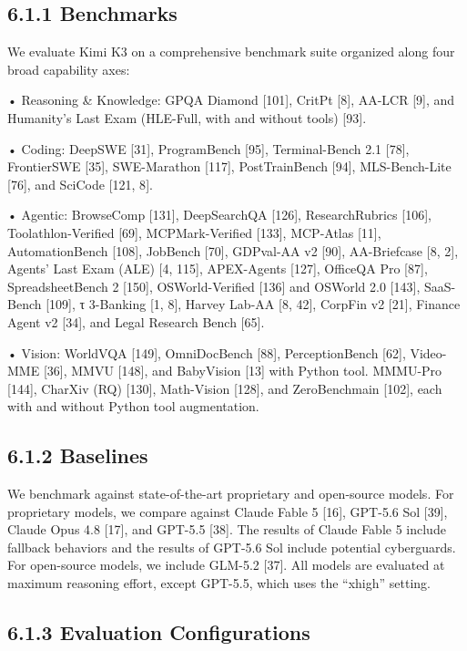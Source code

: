\documentclass[
  10
]{article}
\begin{document}
\subsection{6.1.1 Benchmarks}\label{benchmarks}

We evaluate Kimi K3 on a comprehensive benchmark suite organized along
four broad capability axes:

• Reasoning \& Knowledge: GPQA Diamond {[}101{]}, CritPt {[}8{]}, AA-LCR
{[}9{]}, and Humanity's Last Exam (HLE-Full, with and without tools)
{[}93{]}.

• Coding: DeepSWE {[}31{]}, ProgramBench {[}95{]}, Terminal-Bench 2.1
{[}78{]}, FrontierSWE {[}35{]}, SWE-Marathon {[}117{]}, PostTrainBench
{[}94{]}, MLS-Bench-Lite {[}76{]}, and SciCode {[}121, 8{]}.

• Agentic: BrowseComp {[}131{]}, DeepSearchQA {[}126{]}, ResearchRubrics
{[}106{]}, Toolathlon-Verified {[}69{]}, MCPMark-Verified {[}133{]},
MCP-Atlas {[}11{]}, AutomationBench {[}108{]}, JobBench {[}70{]},
GDPval-AA v2 {[}90{]}, AA-Briefcase {[}8, 2{]}, Agents' Last Exam (ALE)
{[}4, 115{]}, APEX-Agents {[}127{]}, OfficeQA Pro {[}87{]},
SpreadsheetBench 2 {[}150{]}, OSWorld-Verified {[}136{]} and OSWorld 2.0
{[}143{]}, SaaS-Bench {[}109{]}, τ 3-Banking {[}1, 8{]}, Harvey Lab-AA
{[}8, 42{]}, CorpFin v2 {[}21{]}, Finance Agent v2 {[}34{]}, and Legal
Research Bench {[}65{]}.

• Vision: WorldVQA {[}149{]}, OmniDocBench {[}88{]}, PerceptionBench
{[}62{]}, Video-MME {[}36{]}, MMVU {[}148{]}, and BabyVision {[}13{]}
with Python tool. MMMU-Pro {[}144{]}, CharXiv (RQ) {[}130{]},
Math-Vision {[}128{]}, and ZeroBenchmain {[}102{]}, each with and
without Python tool augmentation.

\subsection{6.1.2 Baselines}\label{baselines}

We benchmark against state-of-the-art proprietary and open-source
models. For proprietary models, we compare against Claude Fable 5
{[}16{]}, GPT-5.6 Sol {[}39{]}, Claude Opus 4.8 {[}17{]}, and GPT-5.5
{[}38{]}. The results of Claude Fable 5 include fallback behaviors and
the results of GPT-5.6 Sol include potential cyberguards. For
open-source models, we include GLM-5.2 {[}37{]}. All models are
evaluated at maximum reasoning effort, except GPT-5.5, which uses the
``xhigh'' setting.

\subsection{6.1.3 Evaluation
Configurations}\label{evaluation-configurations}
\end{document}
